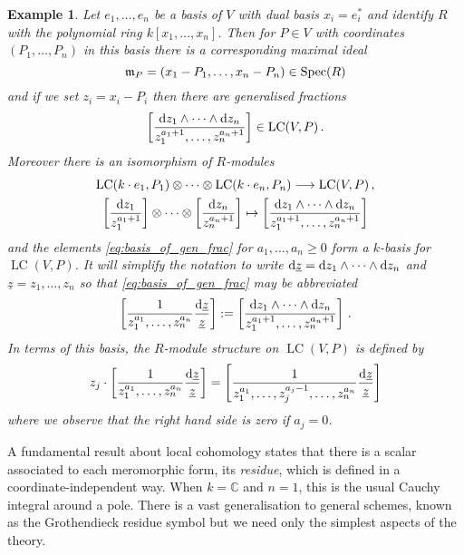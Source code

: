 \documentclass[english,letter paper,12pt,reqno]{article}
\theoremstyle{example}
\newtheorem{example}[theorem]{Example}
\numberwithin{equation}{section}
\DeclareMathOperator{\Spec}{Spec}
\DeclareMathOperator{\LC}{LC}
\begin{document}
\begin{example}\label{example:coordinates_V} Let $e_1,\ldots,e_n$ be a basis of $V$ with dual basis $x_i = e_i^*$ and identify $R$ with the polynomial ring $k[x_1,\ldots,x_n]$. Then for $P \in V$ with coordinates $(P_1,\ldots,P_n)$ in this basis there is a corresponding maximal ideal
\[
\mf{m}_P = (x_1 - P_1, \ldots, x_n - P_n) \in \Spec(R)
\]
and if we set $z_i = x_i - P_i$ then there are generalised fractions
\begin{equation}\label{eq:basis_of_gen_frac}
\left[ \frac{\ud{z_1} \wedge \cdots \wedge \ud{z_n}}{z_1^{a_1+1}, \ldots, z_n^{a_n+1}} \right] \in \LC(V, P)\,.
\end{equation}
Moreover there is an isomorphism of $R$-modules
\begin{gather}
\LC( k \cdot e_1, P_1 ) \otimes \cdots \otimes \LC( k \cdot e_n, P_n ) \lto \LC( V, P )\,,\nonumber\\
\left[ \frac{\ud{z_1}}{z_1^{a_1+1}} \right] \otimes \cdots \otimes \left[ \frac{\ud{z_n}}{z_n^{a_n+1}} \right] \mapsto \left[ \frac{\ud{z_1} \wedge \cdots \wedge \ud{z_n}}{z_1^{a_1+1}, \ldots, z_n^{a_n+1}} \right]\label{eq:one_to_general}
\end{gather}
and the elements \eqref{eq:basis_of_gen_frac} for $a_1,\ldots,a_n \ge 0$ form a $k$-basis for $\LC(V,P)$. It will simplify the notation to write $\operatorname{d}\!{\underline{z}} = \operatorname{d}\!{z_1} \wedge \cdots \wedge \operatorname{d}\!{z_n}$ and $\underline{z} = z_1, \ldots, z_n$ so that \eqref{eq:basis_of_gen_frac} may be abbreviated
\begin{equation}\label{eq:basic_residue_symbols}
\left[ \frac{1}{z_1^{a_1}, \ldots, z_n^{a_n}} \frac{\operatorname{d}\!{\underline{z}}}{\underline{z}} \right] := \left[ \frac{\operatorname{d}\!{z_1} \wedge \cdots \wedge \operatorname{d}\!{z_n}}{z_1^{a_1+1}, \ldots, z_n^{a_n+1}} \right]\,.
\end{equation}
In terms of this basis, the $R$-module structure on $\LC(V,P)$ is defined by
\begin{equation}\label{eq:Ractionres}
z_j \cdot \left[ \frac{1}{z_1^{a_1}, \ldots, z_n^{a_n}} \frac{\operatorname{d}\!{\underline{z}}}{\underline{z}} \right] = \left[ \frac{1}{z_1^{a_1}, \ldots, z_j^{a_j-1}, \ldots, z_n^{a_n}} \frac{\operatorname{d}\!{\underline{z}}}{\underline{z}} \right]
\end{equation}
where we observe that the right hand side is zero if $a_j = 0$.
\end{example}

A fundamental result about local cohomology states that there is a scalar associated to each meromorphic form, its \emph{residue}, which is defined in a coordinate-independent way. When $k = \mathbb{C}$ and $n = 1$, this is the usual Cauchy integral around a pole. There is a vast generalisation to general schemes, known as the Grothendieck residue symbol \cite{residuesduality, lipman_notes} but we need only the simplest aspects of the theory.
\end{document}
